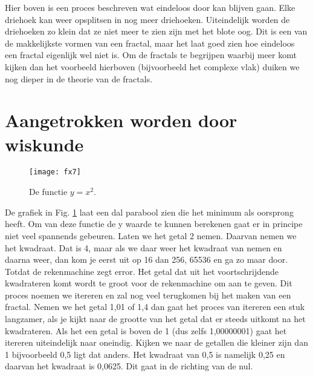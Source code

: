 \documentclass[11pt,fleqn]{book} %
\begin{document}
Hier boven is een proces beschreven wat eindeloos door kan blijven gaan. Elke driehoek kan weer opsplitsen in nog meer driehoeken. Uiteindelijk worden de driehoeken zo klein dat ze niet meer te zien zijn met het blote oog. Dit is een van de makkelijkste vormen van een fractal, maar het laat goed zien hoe eindeloos een fractal eigenlijk wel niet is.
Om de fractals te begrijpen waarbij meer komt kijken dan het voorbeeld hierboven (bijvoorbeeld het complexe vlak) duiken we nog dieper in de theorie van de fractals.

\section{Aangetrokken worden door wiskunde}
\begin{figure}[h]
	\centering\texttt{[image: fx7]}
	\caption{De functie $y=x^2$.}
	\label{fig:fx7}
\end{figure}
De grafiek in Fig. \ref{fig:fx7} laat een dal parabool zien die het minimum als oorsprong heeft. Om van deze functie de y waarde te kunnen berekenen gaat er in principe niet veel spannends gebeuren. Laten we het getal 2 nemen. Daarvan nemen we het kwadraat. Dat is 4, maar als we daar weer het kwadraat van nemen en daarna weer, dan kom je eerst uit op 16 dan 256, 65536 en ga zo maar door. Totdat de rekenmachine zegt error. Het getal dat uit het voortschrijdende kwadrateren komt wordt te groot voor de rekenmachine om aan te geven. Dit proces noemen we itereren en zal nog veel terugkomen bij het maken van een fractal. Nemen we het getal 1,01 of 1,4 dan gaat het proces van itereren een stuk langzamer, als je kijkt naar de grootte van het getal dat er steeds uitkomt na het kwadrateren. Als het een getal is boven de 1 (dus zelfs 1,00000001) gaat het itereren uiteindelijk naar oneindig. Kijken we naar de getallen die kleiner zijn dan 1 bijvoorbeeld 0,5 ligt dat anders. Het kwadraat van 0,5 is namelijk 0,25 en daarvan het kwadraat is 0,0625. Dit gaat in de richting van de nul.
\end{document}
